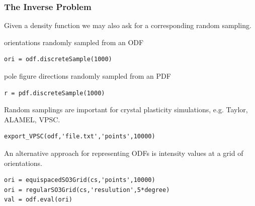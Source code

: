 \documentclass[compress,aspectratio=1610,fleqn]{beamer}
\begin{document}
\begin{frame}[fragile]
  \frametitle{The Inverse Problem}

  Given a density function we may also ask for a corresponding random
  sampling.

  \pause
  \medskip

  orientations randomly sampled from an ODF \vspace{-0.2cm}
  \begin{lstlisting}[style=input]
ori = odf.discreteSample(1000)
  \end{lstlisting}

  \pause
  \medskip

  pole figure directions randomly sampled from an PDF \vspace{-0.2cm}
  \begin{lstlisting}[style=input]
r = pdf.discreteSample(1000)
  \end{lstlisting}

  \pause
  \medskip

  Random samplings are important for crystal plasticity simulations,
  e.g. Taylor, ALAMEL, VPSC.
  \vspace{-0.2cm}
  \begin{lstlisting}[style=input]
export_VPSC(odf,'file.txt','points',10000)
  \end{lstlisting}

  \medskip
  \pause

  An alternative approach for representing ODFs is intensity values at a grid
  of orientations.
  \vspace{-0.2cm}
  \begin{lstlisting}
ori = equispacedSO3Grid(cs,'points',10000)
ori = regularSO3Grid(cs,'resulution',5*degree)
val = odf.eval(ori)
  \end{lstlisting}

\end{frame}
\end{document}
